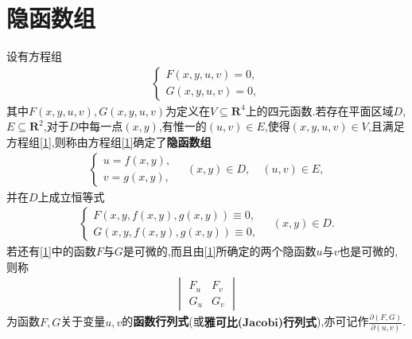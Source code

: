 \documentclass[../../main.tex]{subfiles}%
\begin{document}
\section{隐函数组}

\begin{definition}
设有方程组
\begin{align*}
\begin{cases} 
F(x,y,u,v) = 0, \\
G(x,y,u,v) = 0, 
\end{cases} 
\end{align*}
其中$F(x,y,u,v),G(x,y,u,v)$为定义在$V \subseteq \mathbf{R}^4$上的四元函数.若存在平面区域$D$, $E \subseteq \mathbf{R}^2$,对于$D$中每一点$(x,y)$,有惟一的$(u,v) \in E$,使得$(x,y,u,v) \in V$,且满足方程组\eqref{1},则称由方程组\eqref{1}确定了\textbf{隐函数组}
\begin{align*}
\begin{cases} 
u = f(x,y), \\
v = g(x,y), 
\end{cases} \quad (x,y) \in D, \quad (u,v) \in E,
\end{align*}
并在$D$上成立恒等式
\begin{align*}
\begin{cases} 
F(x,y,f(x,y),g(x,y)) \equiv 0, \\
G(x,y,f(x,y),g(x,y)) \equiv 0, 
\end{cases} \quad (x,y) \in D.
\end{align*}
若还有\eqref{1}中的函数$F$与$G$是可微的,而且由\eqref{1}所确定的两个隐函数$u$与$v$也是可微的,则称
\begin{align*}
\begin{vmatrix} 
F_u & F_v \\
G_u & G_v 
\end{vmatrix} 
\end{align*}
为函数$F,G$关于变量$u,v$的\textbf{函数行列式}(或\textbf{雅可比($\mathbf{Jacobi}$)行列式}),亦可记作$\frac{\partial(F,G)}{\partial(u,v)}$.
\end{definition}
\end{document}
